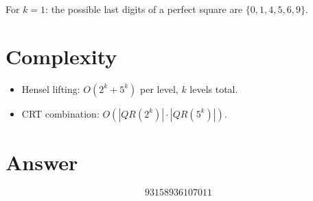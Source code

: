 \documentclass[11pt]{article}
\begin{document}
For $k=1$: the possible last digits of a perfect square are $\{0, 1, 4, 5, 6, 9\}$.

\section{Complexity}

\begin{itemize}
\item Hensel lifting: $O(2^k + 5^k)$ per level, $k$ levels total.
\item CRT combination: $O(|QR(2^k)| \cdot |QR(5^k)|)$.
\end{itemize}

\section{Answer}

\[
\boxed{93158936107011}
\]
\end{document}
